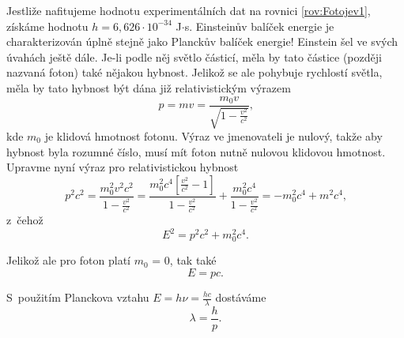 Jestliže nafitujeme hodnotu experimentálních dat na rovnici \ref{rov:Fotojev1}, získáme hodnotu $h= 6,626\cdot10^{-34}$ J$\cdot$s. Einsteinův balíček energie je charakterizován úplně stejně jako Planckův balíček energie! Einstein šel ve svých úvahách ještě dále. Je-li podle něj světlo částicí, měla by tato částice (později nazvaná foton) také nějakou hybnost. Jelikož se ale pohybuje rychlostí světla, měla by tato hybnost být dána již relativistickým výrazem
\begin{equation}
p = mv = \frac{m_0 v}{\sqrt{1-\frac{v^2}{c^2}}}\mbox{,}
\label{rov:Fotojev2}
\end{equation}
kde $m_0$ je klidová hmotnost fotonu. Výraz ve jmenovateli je nulový, takže aby hybnost byla rozumné číslo, musí mít foton nutně nulovou klidovou hmotnost. Upravme nyní výraz pro relativistickou hybnost
\begin{equation}
p^2c^2 = \frac{m_0^2v^2c^2}{1-\frac{v^2}{c^2}} = \frac{m_0^2 c^4 [\frac{v^2}{c^2}-1]}{1-\frac{v^2}{c^2}} + \frac{m_0^2 c^4}{1-\frac{v^2}{c^2}} = -m_0^2 c^4 + m^2c^4\mbox{,}
\label{Fotojev3}
\end{equation}
z~čehož
\begin{equation}
E^2 = p^2c^2+ m_0^2c^4\mbox{.}
\label{Fotojev4}
\end{equation}

\noindent Jelikož ale pro foton platí $m_0$ = 0, tak také
\begin{equation}
E=pc\mbox{.}
\label{rov:Fotojev5}
\end{equation}

\noindent S~použitím Planckova vztahu $E = h\nu = \frac{hc}{\lambda}$ dostáváme
\begin{equation}
\boxed{\lambda = \frac{h}{p}\mbox{.}}
\label{rov:Fotojev6}
\end{equation}

